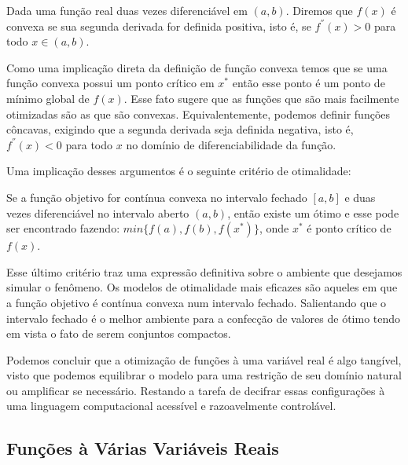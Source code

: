 \begin{definition}
  Dada uma função real duas vezes diferenciável em $(a,b)$. Diremos que $f(x)$ é convexa se sua segunda derivada for definida positiva, isto é, se $f^{''}(x) > 0$ para todo $x \in (a,b)$.
\end{definition}

\par Como uma implicação direta da definição de função convexa temos que se uma função convexa possui um ponto crítico em $x^{*}$ então esse ponto é um ponto de mínimo global de $f(x)$. Esse fato sugere que as funções que são mais facilmente otimizadas são as que são convexas. Equivalentemente, podemos definir funções côncavas, exigindo que a segunda derivada seja definida negativa, isto é, $f^{''}(x) < 0$ para todo $x$ no domínio de diferenciabilidade da função.
\par Uma implicação desses argumentos é o seguinte critério de otimalidade:

\begin{theorem}
  Se a função objetivo for contínua convexa no intervalo fechado $[a,b]$ e duas vezes diferenciável no intervalo aberto $(a,b)$, então existe um ótimo e esse pode ser encontrado fazendo: $min\{f(a), f(b), f(x^{*})\}$, onde $x^{*}$ é ponto crítico de $f(x)$. 
\end{theorem}

\par Esse último critério traz uma expressão definitiva sobre o ambiente que desejamos simular o fenômeno. Os modelos de otimalidade mais eficazes são aqueles em que a função objetivo é contínua convexa num intervalo fechado. Salientando que o intervalo fechado é o melhor ambiente para a confecção de valores de ótimo tendo em vista o fato de serem conjuntos compactos. 
\par Podemos concluir que a otimização de funções à uma variável real é algo tangível, visto que podemos equilibrar o modelo para uma restrição de seu domínio natural ou amplificar se necessário. Restando a tarefa de decifrar essas configurações à uma linguagem computacional acessível e razoavelmente controlável.




\subsection{Funções à Várias Variáveis Reais}

